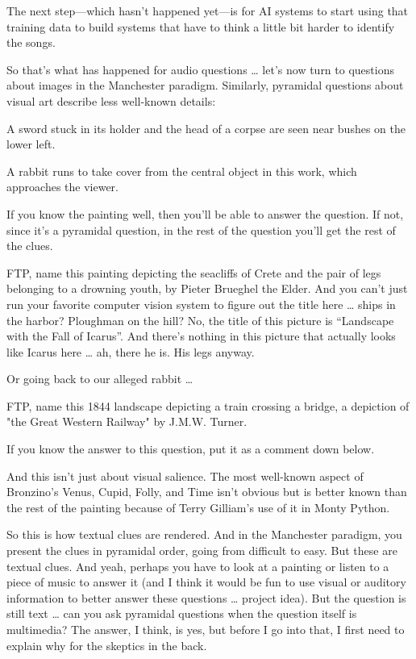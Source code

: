 The next step—which hasn’t happened yet—is for AI systems to start using that training data to build systems that have to think a little bit harder to identify the songs.

So that’s what has happened for audio questions … let’s now turn to questions about images in the Manchester paradigm.  Similarly, pyramidal questions about visual art describe less well-known details:

A sword stuck in its holder and the head of a corpse are seen near bushes on the lower left.

A rabbit runs to take cover from the central object in this work, which approaches the viewer.

If you know the painting well, then you’ll be able to answer the question.  If not, since it’s a pyramidal question, in the rest of the question you’ll get the rest of the clues.    

FTP, name this painting depicting the seacliffs of Crete and the pair of legs belonging to a drowning youth, by Pieter Brueghel the Elder.  And you can’t just run your favorite computer vision system to figure out the title here … ships in the harbor? Ploughman on the hill?  No, the title of this picture is “Landscape with the Fall of Icarus”.  And there’s nothing in this picture that actually looks like Icarus here … ah, there he is.  His legs anyway. 

Or going back to our alleged rabbit … 

FTP, name this 1844 landscape depicting a train crossing a bridge, a depiction of "the Great Western Railway" by J.M.W. Turner.

If you know the answer to this question, put it as a comment down below.  

And this isn’t just about visual salience.  The most well-known aspect of Bronzino’s Venus, Cupid, Folly, and Time isn’t obvious but is better known than the rest of the painting because of Terry Gilliam’s use of it in Monty Python.

So this is how textual clues are rendered.  And in the Manchester paradigm, you present the clues in pyramidal order, going from difficult to easy.  But these are textual clues.  And yeah, perhaps you have to look at a painting or listen to a piece of music to answer it (and I think it would be fun to use visual or auditory information to better answer these questions … project idea).  But the question is still text … can you ask pyramidal questions when the question itself is multimedia?  The answer, I think, is yes, but before I go into that, I first need to explain why for the skeptics in the back.

